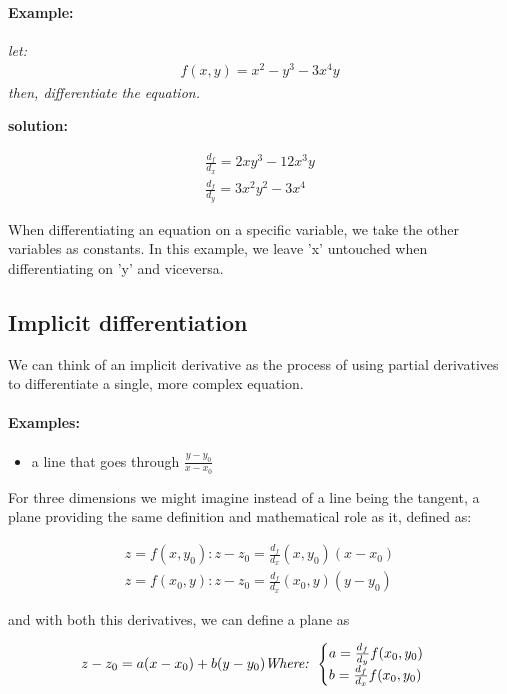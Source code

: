 \documentclass[11pt,fleqn]{book} %
\begin{document}
\paragraph*{Example: }
\textit{let: }
\begin{gather}
    f(x,y) = x^2-y^3 - 3x^4y
\end{gather}
\textit{then, differentiate the equation.}

\textbf{solution:}

\begin{gather}
    \frac{d_f}{d_x} = 2xy^3 - 12x^3y \\
    \frac{d_f}{d_y} = 3x^2y^2 - 3x^4
\end{gather}

When differentiating an equation on a specific variable, we take the other variables as constants.
In this example, we leave 'x' untouched when differentiating on 'y' and viceversa.

\subsection{Implicit differentiation}

We can think of an implicit derivative as the process of using partial derivatives to 
differentiate a single, more complex equation. 

\paragraph{Examples: }

\begin{itemize}
    \item a line that goes through $ \frac{y - y_0}{x - x_0} $

\end{itemize}

For three dimensions we might imagine instead of a line being the tangent, a 
plane providing the same definition and mathematical role as it, defined as:

\begin{gather}
    z = f(x, y_0) : z - z_0 = \frac{d_f}{d_x}(x, y_0)(x-x_0) \\
    z = f(x_0, y) : z - z_0 = \frac{d_f}{d_x}(x_0, y)(y-y_0)
\end{gather}

and with both this derivatives, we can define a plane as 

\begin{equation}
    z - z_0 = a(x-x_0) + b (y-y_0) \text{\textit{Where: }} \begin{cases}
        a = \frac{d_f}{d_y}f(x_0, y_0)\\
        b = \frac{d_f}{d_x}f(x_0,y_0)
    \end{cases}
\end{equation}
\end{document}
